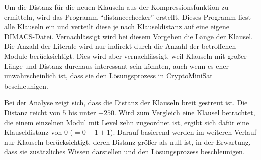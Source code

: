 Um die Distanz für die neuen Klauseln aus der Kompressionsfunktion zu ermitteln, wird das Programm "`distancechecker"' erstellt. Dieses Programm liest alle Klauseln
ein und verteilt diese je nach Klauseldistanz auf eine eigene DIMACS-Datei. Vernachlässigt wird bei diesem Vorgehen die Länge der Klausel. Die Anzahl der Literale
wird nur indirekt durch die Anzahl der betroffenen Module berücksichtigt. Dies wird aber vernachlässigt, weil Klauseln mit großer Länge und Distanz durchaus interessant
sein könnten, auch wenn es eher unwahrscheinlich ist, dass sie den Lösungsprozess in CryptoMiniSat beschleunigen.

Bei der Analyse zeigt sich, dass die Distanz der Klauseln breit gestreut ist. Die Distanz reicht von $5$ bis unter $-250$. Wird zum Vergleich eine Klausel betrachtet,
die einem einzelnen Modul mit Level zehn zugeordnet ist, ergibt sich dafür eine Klauseldistanz von $0$ ($= 0 - 1 + 1$). Darauf basierend werden im weiteren Verlauf
nur Klauseln berücksichtigt, deren Distanz größer als null ist, in der Erwartung, dass sie zusätzliches Wissen darstellen und den Lösungsprozess beschleunigen.